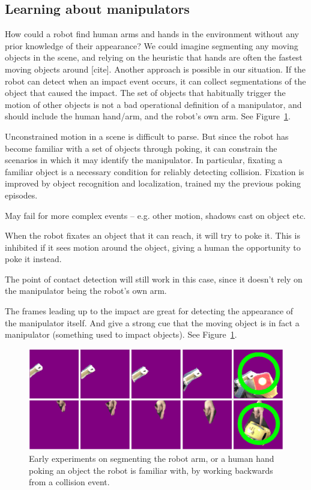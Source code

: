 
\subsection*{Learning about manipulators}

How could a robot find human arms and hands in the environment without
any prior knowledge of their appearance?  We could imagine segmenting
any moving objects in the scene, and relying on the heuristic that
hands are often the fastest moving objects around [cite].
Another approach is possible in our situation.  If the robot can
detect when an impact event occurs, it can collect segmentations of the
object that caused the impact.  The set of objects that habitually
trigger the motion of other objects is not a bad operational 
definition of a manipulator, and should include the human hand/arm,
and the robot's own arm.  See Figure~\ref{fig:manipulator}.

\ifverbose

Unconstrained motion in a scene is difficult to parse.  But since the
robot has become familiar with a set of objects through poking, it can
constrain the scenarios in which it may identify the manipulator.  In
particular, fixating a familiar object is a necessary condition for
reliably detecting collision.  Fixation is improved by object recognition
and localization, trained my the previous poking episodes.

May fail for more complex events -- e.g. other motion, shadows cast on
object etc.

When the robot fixates an object that it can reach, it will try to poke it.
This is inhibited if it sees motion around the object, giving a human the
opportunity to poke it instead.

The point of contact detection will still work in this case, since it 
doesn't rely on the manipulator being the robot's own arm.

The frames leading up to the impact are great for detecting the
appearance of the manipulator itself.  And give a strong cue that the
moving object is in fact a manipulator (something used to impact
objects).  See Figure~\ref{fig:manipulator}.

\fi

\begin{figure}[tbh]
  \centerline{\includegraphics[width=12cm]{manipulator-segment}}
  \caption{Early experiments on segmenting the robot arm, or a 
human hand poking an object the robot is familiar with, by working
backwards from a collision event.}
  \label{fig:manipulator}
\end{figure}

